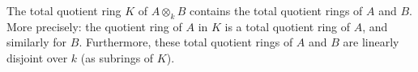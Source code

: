 The total quotient ring $K$ of $A \otimes_k B$ contains the total quotient rings of $A$ and $B$. More precisely: the quotient ring of $A$ in $K$ is a total quotient ring of $A$, and similarly for $B$. Furthermore, these total quotient rings of $A$ and $B$ are linearly disjoint over $k$ (as subrings of $K$).
